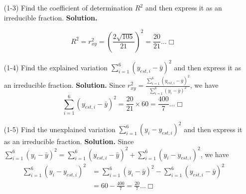 \documentclass[
]{article}
\begin{document}
\begin{enumerate}
\item[(1-3)] Find the coefficient of determination $R^2$ and then express it as an irreducible fraction. \newline
\textbf{Solution.} \newline

$$R^2 = r_{xy}^2 = \left(\frac{2\sqrt{105}}{21}\right)^2 = \frac{20}{21}\dots\Box$$
\item[(1-4)] Find the explained variation $\sum_{i=1}^6(y_{est,i} - \bar{y})^2$ and then express it as an irreducible fraction. \newline
\textbf{Solution.} \newline
Since $r_{xy}^2 = \frac{\sum_{i=1}^6 (y_{est,i} - \bar{y})^2}{\sum_{i=1}^6(y_i - \bar{y})^2}$, we have 
$$\sum_{i=1}^6(y_{est,i} - \bar{y})^2 = \frac{20}{21} \times 60 = \frac{400}{7}\dots \Box$$

\item[(1-5)] Find the unexplained variation $\sum_{i=1}^6(y_i - y_{est,i})^2$ and then express it as an irreducible fraction.\newline
\textbf{Solution.} \newline
Since $\sum_{i=1}^{6}\left(y_{i}-\bar{y}\right)^{2}=\sum_{i=1}^{6}\left(y_{e s t, i}-\bar{y}\right)^{2}+\sum_{i=1}^{6}\left(y_{i}-y_{e s t, i}\right)^{2}$, we have 
$$\begin{aligned}
\sum_{i=1}^{6}\left(y_{i}-y_{e s t, i}\right)^{2}&=\sum_{i=1}^{6}\left(y_{i}-\bar{y}\right)^{2}-\sum_{i=1}^{6}\left(y_{e s t, i}-\bar{y}\right)^{2} \\
&= 60 - \frac{400}{7} = \frac{20}{7} \dots \Box
\end{aligned}$$
\end{enumerate}
\end{document}
